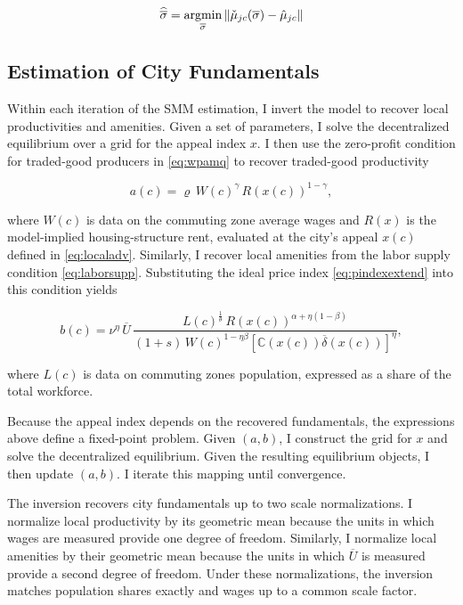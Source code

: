 \begin{equation*}
	\widehat{\overline{\sigma}} = \operatorname*{argmin}_{\overline{\sigma}} \left\| \check{\mu}_{jc}(\overline{\sigma}) - \hat{\mu}_{j c} \right\|
\end{equation*}

\subsection{Estimation of City Fundamentals}\label{a:inv}
Within each iteration of the SMM estimation, I invert the model to recover local productivities and amenities. Given a set of parameters, I solve the decentralized equilibrium over a grid for the appeal index $x$. I then use the zero-profit condition for traded-good producers in \eqref{eq:wpamq} to recover traded-good productivity

\begin{equation*}
	a(c) = \varrho\, W(c)^{\gamma}\, R\left(x(c)\right)^{1-\gamma},
\end{equation*}

where $W(c)$ is data on the commuting zone average wages and $R(x)$ is the model-implied housing-structure rent, evaluated at the city’s appeal $x(c)$ defined in \eqref{eq:localadv}. Similarly, I recover local amenities from the labor supply condition \eqref{eq:laborsupp}. Substituting the ideal price index \eqref{eq:pindexextend} into this condition yields

\begin{equation*}
	b(c) = \nu^{\eta}\, \overline{U}\, \frac{L(c)^{\frac{1}{\theta}}\, R\left(x(c)\right)^{\alpha + \eta(1-\beta)}}{(1+s)\, W(c)^{1-\eta\beta} \left[\mathbb{C}\left(x(c)\right) \overline{\delta}\left(x(c)\right)\right]^{\eta}},
\end{equation*}

where $L(c)$ is data on commuting zones population, expressed as a share of the total workforce. 

Because the appeal index depends on the recovered fundamentals, the expressions above define a fixed-point problem. Given $(a,b)$, I construct the grid for $x$ and solve the decentralized equilibrium. Given the resulting equilibrium objects, I then update $(a,b)$. I iterate this mapping until convergence.

The inversion recovers city fundamentals up to two scale normalizations. I normalize local productivity by its geometric mean because the units in which wages are measured provide one degree of freedom. Similarly, I normalize local amenities by their geometric mean because the units in which $\overline{U}$ is measured provide a second degree of freedom. Under these normalizations, the inversion matches population shares exactly and wages up to a common scale factor.

